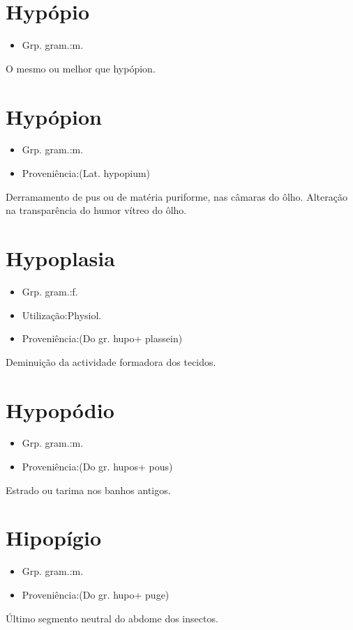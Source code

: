 \documentclass{article}
\begin{document}
\section{Hypópio}
\begin{itemize}
\item {Grp. gram.:m.}
\end{itemize}
O mesmo ou melhor que \textunderscore hypópion\textunderscore .
\section{Hypópion}
\begin{itemize}
\item {Grp. gram.:m.}
\end{itemize}
\begin{itemize}
\item {Proveniência:(Lat. \textunderscore hypopium\textunderscore )}
\end{itemize}
Derramamento de pus ou de matéria puriforme, nas câmaras do ôlho.
Alteração na transparência do humor vítreo do ôlho.
\section{Hypoplasia}
\begin{itemize}
\item {Grp. gram.:f.}
\end{itemize}
\begin{itemize}
\item {Utilização:Physiol.}
\end{itemize}
\begin{itemize}
\item {Proveniência:(Do gr. \textunderscore hupo\textunderscore  + \textunderscore plassein\textunderscore )}
\end{itemize}
Deminuição da actividade formadora dos tecidos.
\section{Hypopódio}
\begin{itemize}
\item {Grp. gram.:m.}
\end{itemize}
\begin{itemize}
\item {Proveniência:(Do gr. \textunderscore hupos\textunderscore  + \textunderscore pous\textunderscore )}
\end{itemize}
Estrado ou tarima nos banhos antigos.
\section{Hipopígio}
\begin{itemize}
\item {Grp. gram.:m.}
\end{itemize}
\begin{itemize}
\item {Proveniência:(Do gr. \textunderscore hupo\textunderscore  + \textunderscore puge\textunderscore )}
\end{itemize}
Último segmento neutral do abdome dos insectos.
\end{document}

